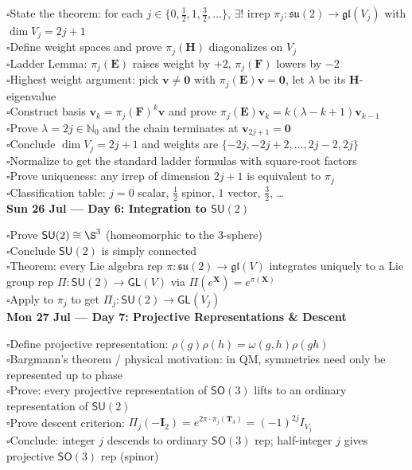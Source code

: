 \documentclass[11pt]{article}
\newcommand{\todo}{\textcolor{pending}{\Large $\square$}}
\newcommand{\secname}[1]{\vspace{1em}\noindent\textcolor{sectioncolor}{\Large\bfseries #1}}
\newcommand{\su}{\mathfrak{su}}
\newcommand{\SO}{\mathsf{SO}}
\newcommand{\SU}{\mathsf{SU}}
\newcommand{\GL}{\mathsf{GL}}
\newcommand{\N}{\mathbb{N}}
\newcommand{\gl}{\mathfrak{gl}}
\begin{document}
\todo\quad State the theorem: for each $j\in\{0,\frac12,1,\frac32,\dots\}$, $\exists!$ irrep $\pi_j:\su(2)\to\gl(V_j)$ with $\dim V_j=2j+1$\\
\todo\quad Define weight spaces and prove $\pi_j(\bm H)$ diagonalizes on $V_j$\\
\todo\quad Ladder Lemma: $\pi_j(\bm E)$ raises weight by $+2$, $\pi_j(\bm F)$ lowers by $-2$\\
\todo\quad Highest weight argument: pick $\bm v\neq\bm0$ with $\pi_j(\bm E)\bm v=\bm0$, let $\lambda$ be its $\bm H$-eigenvalue\\
\todo\quad Construct basis $\bm v_k=\pi_j(\bm F)^k\bm v$ and prove $\pi_j(\bm E)\bm v_k=k(\lambda-k+1)\bm v_{k-1}$\\
\todo\quad Prove $\lambda=2j\in\N_0$ and the chain terminates at $\bm v_{2j+1}=\bm0$\\
\todo\quad Conclude $\dim V_j=2j+1$ and weights are $\{-2j,-2j+2,\dots,2j-2,2j\}$\\
\todo\quad Normalize to get the standard ladder formulas with square-root factors\\
\todo\quad Prove uniqueness: any irrep of dimension $2j+1$ is equivalent to $\pi_j$\\
\todo\quad Classification table: $j=0$ scalar, $\frac12$ spinor, $1$ vector, $\frac32$, \dots\\

\secname{Sun 26 Jul --- Day 6: Integration to \texorpdfstring{$\SU(2)$}{SU(2)}}

\todo\quad Prove $\SU(2)\cong\S^3$ (homeomorphic to the 3-sphere)\\
\todo\quad Conclude $\SU(2)$ is simply connected\\
\todo\quad Theorem: every Lie algebra rep $\pi:\su(2)\to\gl(V)$ integrates uniquely to a Lie group rep $\Pi:\SU(2)\to\GL(V)$ via $\Pi(e^{\bm X})=e^{\pi(\bm X)}$\\
\todo\quad Apply to $\pi_j$ to get $\Pi_j:\SU(2)\to\GL(V_j)$\\

\secname{Mon 27 Jul --- Day 7: Projective Representations \& Descent}

\todo\quad Define projective representation: $\rho(g)\rho(h)=\omega(g,h)\rho(gh)$\\
\todo\quad Bargmann's theorem / physical motivation: in QM, symmetries need only be represented up to phase\\
\todo\quad Prove: every projective representation of $\SO(3)$ lifts to an ordinary representation of $\SU(2)$\\
\todo\quad Prove descent criterion: $\Pi_j(-\bm I_2)=e^{2\pi\cdot\pi_j(\bm T_3)}=(-1)^{2j}I_{V_j}$\\
\todo\quad Conclude: integer $j$ descends to ordinary $\SO(3)$ rep; half-integer $j$ gives projective $\SO(3)$ rep (spinor)\\
\end{document}
